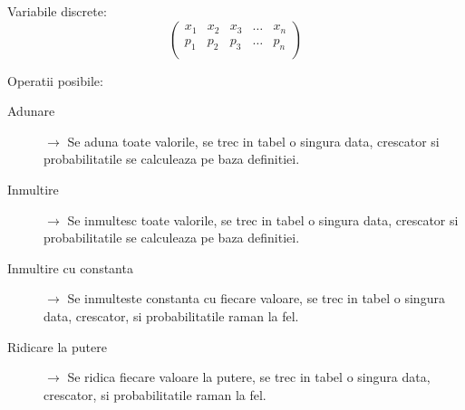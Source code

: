 \documentclass{article}
\begin{document}
Variabile discrete:
\[
  \begin{pmatrix}
    x_1 & x_2 & x_3 & \ldots & x_n \\
    p_1 & p_2 & p_3 & \ldots & p_n \\
  \end{pmatrix}
\]

Operatii posibile:
\begin{description}
  \item[Adunare] $\rightarrow$ Se aduna toate valorile, se trec in tabel o singura data, crescator si probabilitatile se calculeaza pe baza definitiei.
  \item[Inmultire] $\rightarrow$ Se inmultesc toate valorile, se trec in tabel o singura data, crescator si probabilitatile se calculeaza pe baza definitiei.
  \item[Inmultire cu constanta] $\rightarrow$ Se inmulteste constanta cu fiecare valoare, se trec in tabel o singura data, crescator, si probabilitatile raman la fel.
  \item[Ridicare la putere] $\rightarrow$ Se ridica fiecare valoare la putere, se trec in tabel o singura data, crescator, si probabilitatile raman la fel.
\end{description}
\end{document}
